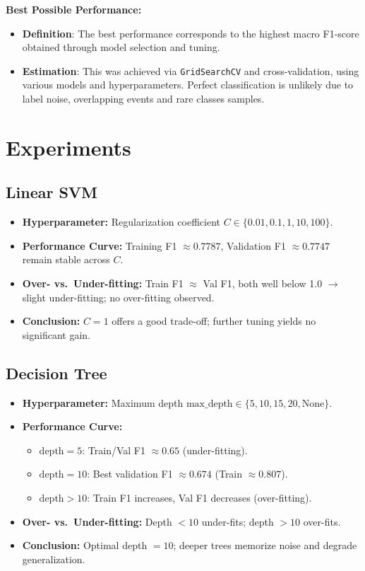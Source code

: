 \documentclass{article}
\begin{document}
\textbf{Best Possible Performance:}
\begin{itemize}
    \item \textbf{Definition}: The best performance corresponds to the highest macro F1-score obtained through model selection and tuning.
    \item \textbf{Estimation}: This was achieved via \texttt{GridSearchCV} and cross-validation, using various models and hyperparameters. Perfect classification is unlikely due to label noise, overlapping events and rare classes samples.
\end{itemize}

\section{Experiments}

\subsection{Linear SVM}
\begin{itemize}
  \item \textbf{Hyperparameter:} Regularization coefficient $C \in \{0.01, 0.1, 1, 10, 100\}$.
  \item \textbf{Performance Curve:} Training F1 $\approx0.7787$, Validation F1 $\approx0.7747$ remain stable across $C$.
  \item \textbf{Over- vs.\ Under-fitting:} Train F1 $\approx$ Val F1, both well below 1.0 $\rightarrow$ slight under-fitting; no over-fitting observed.
  \item \textbf{Conclusion:} $C=1$ offers a good trade-off; further tuning yields no significant gain.
\end{itemize}

\subsection{Decision Tree}
\begin{itemize}
  \item \textbf{Hyperparameter:} Maximum depth $\text{max\_depth} \in \{5, 10, 15, 20, \text{None}\}$.
  \item \textbf{Performance Curve:}
    \begin{itemize}
      \item $\text{depth}=5$: Train/Val F1 $\approx0.65$ (under-fitting).
      \item $\text{depth}=10$: Best validation F1 $\approx0.674$ (Train $\approx0.807$).
      \item $\text{depth}>10$: Train F1 increases, Val F1 decreases (over-fitting).
    \end{itemize}
  \item \textbf{Over- vs.\ Under-fitting:} Depth $<10$ under-fits; depth $>10$ over-fits.
  \item \textbf{Conclusion:} Optimal depth $=10$; deeper trees memorize noise and degrade generalization.
\end{itemize}
\end{document}
